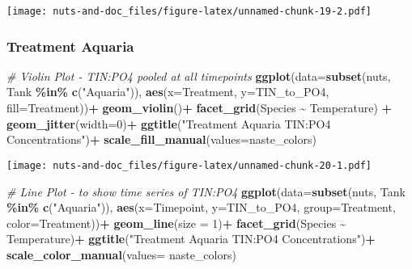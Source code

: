 \documentclass[
]{article}
\newenvironment{Shaded}{\begin{snugshade}}{\end{snugshade}}
\newcommand{\AttributeTok}[1]{\textcolor[rgb]{0.13,0.29,0.53}{#1}}
\newcommand{\CommentTok}[1]{\textcolor[rgb]{0.56,0.35,0.01}{\textit{#1}}}
\newcommand{\DecValTok}[1]{\textcolor[rgb]{0.00,0.00,0.81}{#1}}
\newcommand{\FunctionTok}[1]{\textcolor[rgb]{0.13,0.29,0.53}{\textbf{#1}}}
\newcommand{\NormalTok}[1]{#1}
\newcommand{\SpecialCharTok}[1]{\textcolor[rgb]{0.81,0.36,0.00}{\textbf{#1}}}
\newcommand{\StringTok}[1]{\textcolor[rgb]{0.31,0.60,0.02}{#1}}
\begin{document}
\texttt{[image: nuts-and-doc\_files/figure-latex/unnamed-chunk-19-2.pdf]}

\hypertarget{treatment-aquaria-5}{%
\subsubsection{Treatment Aquaria}\label{treatment-aquaria-5}}

\begin{Shaded}
\begin{Highlighting}[]
\CommentTok{\# Violin Plot {-} TIN:PO4 pooled at all timepoints}
\FunctionTok{ggplot}\NormalTok{(}\AttributeTok{data=}\FunctionTok{subset}\NormalTok{(nuts, Tank }\SpecialCharTok{\%in\%} \FunctionTok{c}\NormalTok{(}\StringTok{"Aquaria"}\NormalTok{)), }\FunctionTok{aes}\NormalTok{(}\AttributeTok{x=}\NormalTok{Treatment, }\AttributeTok{y=}\NormalTok{TIN\_to\_PO4, }\AttributeTok{fill=}\NormalTok{Treatment))}\SpecialCharTok{+}
  \FunctionTok{geom\_violin}\NormalTok{()}\SpecialCharTok{+}
  \FunctionTok{facet\_grid}\NormalTok{(Species }\SpecialCharTok{\textasciitilde{}}\NormalTok{ Temperature) }\SpecialCharTok{+}
  \FunctionTok{geom\_jitter}\NormalTok{(}\AttributeTok{width=}\DecValTok{0}\NormalTok{)}\SpecialCharTok{+}
  \FunctionTok{ggtitle}\NormalTok{(}\StringTok{"Treatment Aquaria TIN:PO4 Concentrations"}\NormalTok{)}\SpecialCharTok{+}
  \FunctionTok{scale\_fill\_manual}\NormalTok{(}\AttributeTok{values=}\NormalTok{naste\_colors)}
\end{Highlighting}
\end{Shaded}

\texttt{[image: nuts-and-doc\_files/figure-latex/unnamed-chunk-20-1.pdf]}

\begin{Shaded}
\begin{Highlighting}[]
\CommentTok{\# Line Plot {-} to show time series of TIN:PO4}
\FunctionTok{ggplot}\NormalTok{(}\AttributeTok{data=}\FunctionTok{subset}\NormalTok{(nuts, Tank }\SpecialCharTok{\%in\%} \FunctionTok{c}\NormalTok{(}\StringTok{"Aquaria"}\NormalTok{)), }\FunctionTok{aes}\NormalTok{(}\AttributeTok{x=}\NormalTok{Timepoint, }\AttributeTok{y=}\NormalTok{TIN\_to\_PO4, }\AttributeTok{group=}\NormalTok{Treatment, }\AttributeTok{color=}\NormalTok{Treatment))}\SpecialCharTok{+}
  \FunctionTok{geom\_line}\NormalTok{(}\AttributeTok{size =} \DecValTok{1}\NormalTok{)}\SpecialCharTok{+}
  \FunctionTok{facet\_grid}\NormalTok{(Species }\SpecialCharTok{\textasciitilde{}}\NormalTok{ Temperature)}\SpecialCharTok{+}
  \FunctionTok{ggtitle}\NormalTok{(}\StringTok{"Treatment Aquaria TIN:PO4 Concentrations"}\NormalTok{)}\SpecialCharTok{+}
  \FunctionTok{scale\_color\_manual}\NormalTok{(}\AttributeTok{values=}\NormalTok{ naste\_colors)}
\end{Highlighting}
\end{Shaded}
\end{document}
